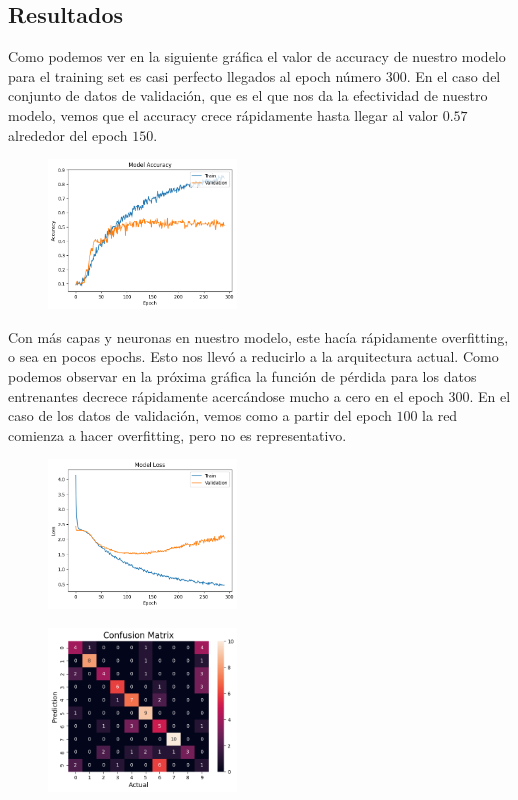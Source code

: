 \documentclass[colorinlistoftodos,twoside,twocolumn,10pt]{article} %
\begin{document}
\subsection{Resultados}

Como podemos ver en la siguiente gr\'afica el valor de accuracy de nuestro modelo para el training set es casi perfecto llegados al epoch n\'umero $300$. En el caso del conjunto de  datos de validaci\'on, que es el que nos da la efectividad de nuestro modelo, vemos que el accuracy crece r\'apidamente hasta llegar al valor $0.57$ alrededor del epoch $150$.

\begin{figure}[h!]
	\includegraphics[width=5cm]{vl_accuracy.png}
\end{figure}

Con m\'as capas y neuronas en nuestro modelo, este hac\'ia r\'apidamente overfitting, o sea en pocos epochs. Esto nos llev\'o a reducirlo a la arquitectura actual. Como podemos observar en la pr\'oxima gr\'afica la funci\'on de p\'erdida para los datos entrenantes decrece r\'apidamente acerc\'andose mucho a cero en el epoch $300$. En el caso de los datos de validaci\'on, vemos como a partir del epoch $100$ la red comienza a hacer overfitting, pero no es representativo. 

\begin{figure}[h!]
	\includegraphics[width=5cm]{vl_loss.png}
\end{figure}


\begin{figure}[h!]
	\includegraphics[width=5cm]{vl_confussion_matrix.png}
\end{figure}
\end{document}
